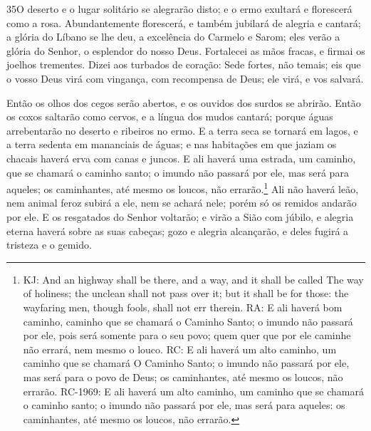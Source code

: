 \medskip

\lettrine{35}{}O deserto e o lugar solitário se alegrarão
disto; e o ermo exultará e florescerá como a rosa.
Abundantemente florescerá, e também jubilará de alegria e
cantará; a glória do Líbano se lhe deu, a excelência do Carmelo e
Sarom; eles verão a glória do Senhor, o esplendor do nosso Deus.
Fortalecei as mãos fracas, e firmai os joelhos trementes.
Dizei aos turbados de coração: Sede fortes, não temais; eis que
o vosso Deus virá com vingança, com recompensa de Deus; ele virá, e
vos salvará.

Então os olhos dos cegos serão abertos, e os ouvidos dos surdos se
abrirão. Então os coxos saltarão como cervos, e a língua dos
mudos cantará; porque águas arrebentarão no deserto e ribeiros no
ermo. E a terra seca se tornará em lagos, e a terra sedenta em
mananciais de águas; e nas habitações em que jaziam os chacais
haverá erva com canas e juncos. E ali haverá uma estrada, um
caminho, que se chamará o caminho santo; o imundo não passará por
ele, mas será para aqueles; os caminhantes, até mesmo os loucos, não
errarão.\footnote{KJ: And an highway shall be there, and a way, and
it shall be called The way of holiness; the unclean shall not pass
over it; but it shall be for those: the wayfaring men, though fools,
shall not err therein. RA: E ali haverá bom caminho, caminho que se
chamará o Caminho Santo; o imundo não passará por ele, pois será
somente para o seu povo; quem quer que por ele caminhe não errará,
nem mesmo o louco. RC: E ali haverá um alto caminho, um caminho que
se chamará O Caminho Santo; o imundo não passará por ele, mas será
para o povo de Deus; os caminhantes, até mesmo os loucos, não
errarão. RC-1969: E ali haverá um alto caminho, um caminho que se
chamará o caminho santo; o imundo não passará por ele, mas será para
aqueles: os caminhantes, até mesmo os loucos, não errarão.} Ali
não haverá leão, nem animal feroz subirá a ele, nem se achará nele;
porém só os remidos andarão por ele. E os resgatados do
Senhor voltarão; e virão a Sião com júbilo, e alegria eterna haverá
sobre as suas cabeças; gozo e alegria alcançarão, e deles fugirá a
tristeza e o gemido.

\medskip

